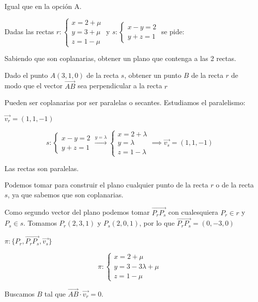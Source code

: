 \documentclass[palatino,nosec,nochap,nobuilddate]{Docencia}
\renewcommand{\vec}[1]{\overrightarrow{#1}}
\begin{document}
\begin{problem}[4]
Igual que en la opción A.
\solution
\end{problem}

\begin{problem}[5]
Dadas las rectas $r:\begin{cases}x=2+\mu\\y=3+\mu\\z=1-\mu\end{cases}$ y $s:\begin{cases}x-y=2\\y+z=1\end{cases}$ se pide:

\ppart Sabiendo que son coplanarias, obtener un plano que contenga a las 2 rectas.

\ppart Dado el punto $A(3,1,0)$ de la recta $s$, obtener un punto $B$ de la recta $r$ de modo que el vector $\vec{AB}$ sea perpendicular a la recta $r$

\solution

\spart
Pueden ser coplanarias por ser paralelas o secantes. Estudiamos el paralelismo:

$\vec{v_r} = (1,1,-1)$

\[
s:\begin{cases}x-y=2\\y+z=1\end{cases} \overset{y=\lambda}{\to} \begin{cases}x=2+\lambda\\y=\lambda\\z=1-\lambda\end{cases} \implies \vec{v_s} = (1,1,-1)
\]

Las rectas son paralelas.

Podemos tomar para construir el plano cualquier punto de la recta $r$ o de la recta $s$, ya que sabemos que son coplanarias. 

Como segundo vector del plano podemos tomar $\vec{P_rP_s}$ con cualesquiera $P_r\in r$ y $P_s\in s$. Tomamos $P_r(2,3,1)$ y $P_s(2,0,1)$, por lo que $\vec{P_rP_s} = (0,-3,0)$

$\pi:\{P_r,\vec{P_rP_s},\vec{v_s}\}$

\[
\pi:\begin{cases}x=2+\mu\\y=3-3\lambda+\mu\\z=1-\mu\end{cases}
\]

\spart

Buscamos $B$ tal que $\vec{AB}·\vec{v_r} = 0$.


\end{problem}
\end{document}
